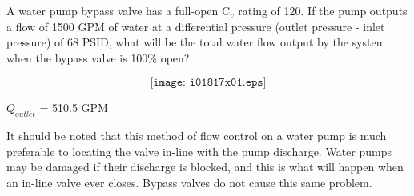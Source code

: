 

A water pump bypass valve has a full-open C$_{v}$ rating of 120.  If the pump outputs a flow of 1500 GPM of water at a differential pressure (outlet pressure - inlet pressure) of 68 PSID, what will be the total water flow output by the system when the bypass valve is 100\% open?

$$\texttt{[image: i01817x01.eps]}$$








$Q_{outlet}$ = 510.5 GPM
 






It should be noted that this method of flow control on a water pump is much preferable to locating the valve in-line with the pump discharge.  Water pumps may be damaged if their discharge is blocked, and this is what will happen when an in-line valve ever closes.  Bypass valves do not cause this same problem.





